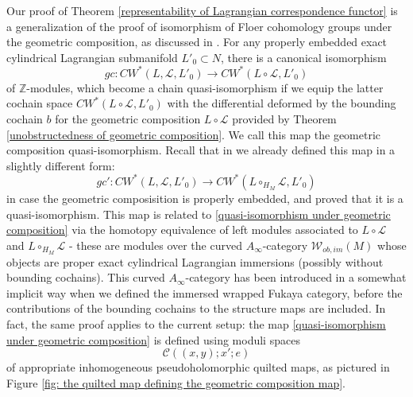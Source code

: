 \documentclass{amsart}
\numberwithin{equation}{section}
\numberwithin{figure}{section}
\begin{document}
	Our proof of Theorem \ref{representability of Lagrangian correspondence functor} is a generalization of the proof of isomorphism of Floer cohomology groups under the geometric composition, as discussed in \cite{Gao1}. For any properly embedded exact cylindrical Lagrangian submanifold $L'_{0} \subset N$, there is a canonical isomorphism
\begin{equation} \label{quasi-isomorphism under geometric composition}
gc: CW^{*}(L, \mathcal{L}, L'_{0}) \to CW^{*}(L \circ \mathcal{L}, L'_{0})
\end{equation}
of $\mathbb{Z}$-modules, which become a chain quasi-isomorphism if we equip the latter cochain space $CW^{*}(L \circ \mathcal{L}, L'_{0})$ with the differential deformed by the bounding cochain $b$ for the geometric composition $L \circ \mathcal{L}$ provided by Theorem \ref{unobstructedness of geometric composition}. We call this map the geometric composition quasi-isomorphism. Recall that in \cite{Gao1} we already defined this map in a slightly different form:
\begin{equation*}
gc': CW^{*}(L, \mathcal{L}, L'_{0}) \to CW^{*}(L \circ_{H_{M}} \mathcal{L}, L'_{0})
\end{equation*}
in case the geometric composisition is properly embedded, and proved that it is a quasi-isomorphism. This map is related to \eqref{quasi-isomorphism under geometric composition} via the homotopy equivalence of left modules associated to $L \circ \mathcal{L}$ and $L \circ_{H_{M}} \mathcal{L}$ - these are modules over the curved $A_{\infty}$-category $\mathcal{W}_{ob, im}(M)$ whose objects are proper exact cylindrical Lagrangian immersions (possibly without bounding cochains). This curved $A_{\infty}$-category has been introduced in a somewhat implicit way when we defined the immersed wrapped Fukaya category, before the contributions of the bounding cochains to the structure maps are included. 
In fact, the same proof applies to the current setup: the map \eqref{quasi-isomorphism under geometric composition} is defined using moduli spaces
\begin{equation}\label{moduli space of quilted maps defining the first order term of the geometric composition map}
\mathcal{C}((x, y); x'; e)
\end{equation}
of appropriate inhomogeneous pseudoholomorphic quilted maps, as pictured in Figure \ref{fig: the quilted map defining the geometric composition map}. \par
\end{document}
